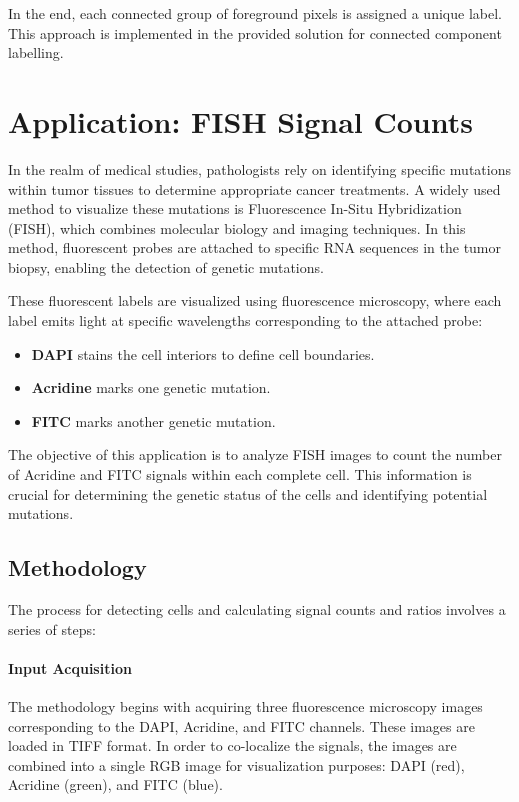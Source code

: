 \documentclass[a4paper,12pt]{article}
\begin{document}
In the end, each connected group of foreground pixels is assigned a unique label. This approach is implemented in the provided solution for connected component labelling.

\newpage

\section{Application: FISH Signal Counts}

In the realm of medical studies, pathologists rely on identifying specific mutations within tumor tissues to determine appropriate cancer treatments. A widely used method to visualize these mutations is Fluorescence In-Situ Hybridization (FISH), which combines molecular biology and imaging techniques. In this method, fluorescent probes are attached to specific RNA sequences in the tumor biopsy, enabling the detection of genetic mutations.

These fluorescent labels are visualized using fluorescence microscopy, where each label emits light at specific wavelengths corresponding to the attached probe:
\begin{itemize}
    \item \textbf{DAPI} stains the cell interiors to define cell boundaries.
    \item \textbf{Acridine} marks one genetic mutation.
    \item \textbf{FITC} marks another genetic mutation.
\end{itemize}

The objective of this application is to analyze FISH images to count the number of Acridine and FITC signals within each complete cell. This information is crucial for determining the genetic status of the cells and identifying potential mutations.

\subsection{Methodology}

The process for detecting cells and calculating signal counts and ratios involves a series of steps:

\paragraph{Input Acquisition}

The methodology begins with acquiring three fluorescence microscopy images corresponding to the DAPI, Acridine, and FITC channels. These images are loaded in TIFF format. In order to co-localize the signals, the images are combined into a single RGB image for visualization purposes: DAPI (red), Acridine (green), and FITC (blue).
\end{document}

